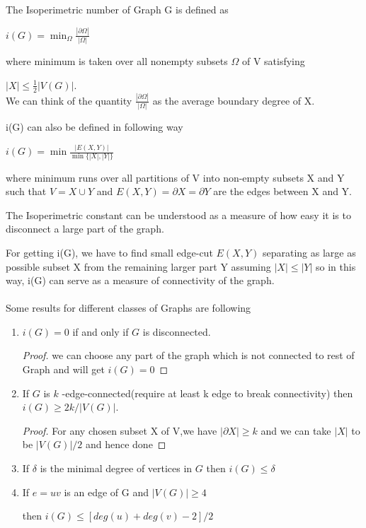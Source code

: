 \documentclass[oneside]{book}
\begin{document}
	
	The Isoperimetric number of Graph G is defined as \par
	\begin{center}
		$i(G)=\min _{\Omega} \frac{|\partial \Omega|}{|\Omega|}$
	\end{center}
	where minimum is taken over all nonempty subsets $\Omega$ of V satisfying\par $|X| \leq \frac{1}{2}|V(G)|$.
	\\           We can think of the quantity  $\frac{|\partial \Omega|}{|\Omega|}$ as the average boundary degree of X. \par
	i(G) can also be defined in following way \par
	\begin{center}
		$i(G)=\min \frac{|E(X, Y)|}{\min \{|X|,|Y|\}}$
	\end{center}
	where minimum runs over all partitions of V into non-empty subsets X and Y such that  $V=X \cup Y$ and $E(X, Y)=\partial X=\partial Y$ are the edges between X and Y.
	\par
	The Isoperimetric constant can be understood as a measure of how easy
	it is to disconnect a large part of the graph. \par
	For getting i(G), we have to find small edge-cut $E(X, Y)$ separating as large as possible subset X from the remaining larger part Y assuming $|X|\leq |Y|$ so in this way, i(G) can serve as a measure of connectivity of the graph. \\\\
	Some results for different classes of Graphs are following \par
	\begin{enumerate}
		
		
		\item  $i(G)=0$ if and only if $G$ is disconnected. \par
		\begin{proof}
			we can choose  any part of the graph which is not connected to rest of Graph and will get $i(G)=0$
		\end{proof} \par
		\item  If $G$ is $k$ -edge-connected(require at least k edge to break connectivity) then $i(G) \geq 2 k /|V(G)|$. \par
		\begin{proof}
			
			For any chosen subset X of V,we have  $|\partial X| \geq k$ and we can take $|X|$ to be $|V(G)|/2$ and hence done 
		\end{proof}
		\item  If $\delta$ is the minimal degree of vertices in $G$ then $i(G) \leq\delta$ \par
		\item  If   $e=u v$ is   an  edge  of G  and $|V(G)| \geq 4$ \par then  $i(G) \leq [deg(u)+deg(v)-2] / 2$ \par
	\end{enumerate}
	
\end{document}
